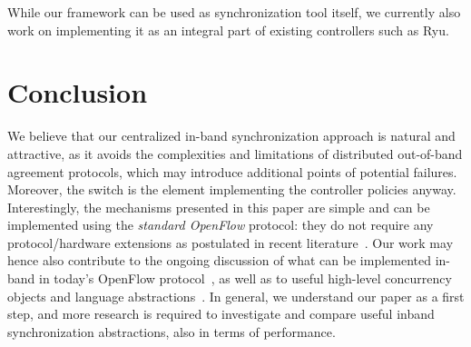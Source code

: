 \documentclass[conference]{sigcomm-alternate}
\begin{document}
While our framework can be used as synchronization tool itself, we 
currently also work on implementing it as an integral part of existing controllers 
such as Ryu. 


\section{Conclusion}\label{sec:conclusion}


We believe that our centralized in-band
synchronization approach is natural and attractive, as it avoids the
complexities and limitations of distributed out-of-band agreement protocols, which may 
introduce additional points of potential failures.
Moreover, the switch is the element implementing the
controller policies anyway.
Interestingly, the mechanisms presented in this paper are simple and can be implemented using the \emph{standard OpenFlow}
protocol: they do not require any protocol/hardware extensions as postulated in recent literature~\cite{stn,netpaxos}.
Our work may hence also contribute to the ongoing discussion of what can be implemented
in-band in today's OpenFlow protocol~\cite{reclaim},
as well as to useful high-level concurrency objects and
language abstractions~\cite{pyretic}.
In general, we understand our paper as a first step, and more
research is required to investigate and compare useful
inband synchronization abstractions, also in terms of performance.
{

}
\end{document}
